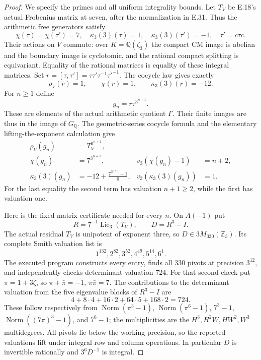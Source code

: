 \documentclass[11pt,oneside]{article}
\begin{document}
\begin{proof}
We specify the primes and all uniform
integrality bounds. Let $T_V$ be E.18's
actual Frobenius matrix at seven, after
the normalization in E.31. Thus the
arithmetic free generators satisfy
\[
 \chi(\tau)=\chi(\tau')=7,
 \quad \kappa_3(3)(\tau)=1,
 \quad \kappa_3(3)(\tau')=-1,
 \quad \tau'=c\tau c.
 \tag{E.38.3}
\]
Their actions on $V$ commute: over
$K=\mathbb Q(\zeta_3)$ the compact CM
image is abelian and the boundary image
is cyclotomic, and the rational compact
splitting is equivariant. Equality of
the rational matrices is equality of
these integral matrices. Set
$r=[\tau,\tau']=\tau\tau'\tau^{-1}\tau'^{-1}$.
The cocycle law gives exactly
\[
           \rho_V(r)=1,\qquad
           \chi(r)=1,\qquad
           \kappa_3(3)(r)=-12.
 \tag{E.38.4}
\]
For $n\ge1$ define
\[
                  g_n=r\tau^{3^{n+1}}.
 \tag{E.38.5}
\]
These are elements of the actual
arithmetic quotient $\Gamma$.
Their finite images are thus in the
image of $G_{\mathbb Q}$.
The geometric-series cocycle formula
and the elementary lifting-the-exponent
calculation give
\[
 \begin{aligned}
 \rho_V(g_n)&=T_V^{3^{n+1}},\\
 \chi(g_n)&=7^{3^{n+1}},
       &v_3(\chi(g_n)-1)&=n+2,\\
 \kappa_3(3)(g_n)&=-12+
       \frac{7^{3^{n+1}}-1}{6},
       &v_3(\kappa_3(3)(g_n))&=1.
 \end{aligned}
 \tag{E.38.6}
\]
For the last equality the second term
has valuation $n+1\ge2$, while the
first has valuation one.

Here is the fixed matrix certificate
needed for every $n$. On $A(-1)$ put
\[
 R=7^{-1}\operatorname{Lie}_3(T_V),
       \qquad D=R^3-I.
\]
The actual residual $T_V$ is unipotent
of exponent three, so $D\in3M_{330}(\mathbb Z_3)$.
Its complete Smith valuation list is
\[
                 1^{132},2^{82},3^{52},
                       4^{49},5^{14},6^1.
 \tag{E.38.7}
\]
The executed program constructs every
entry, finds all $330$ pivots at
precision $3^{12}$, and independently
checks determinant valuation $724$.
For that second check put
$\pi=1+3\zeta$, so
$\pi+\bar\pi=-1$, $\pi\bar\pi=7$.
The contributions to the determinant
valuation from the five eigenvalue
blocks of $R^3-I$ are
\[
                  4+8\cdot4+16\cdot2
                       +64\cdot5+168\cdot2=724.
\]
These follow respectively from
$\operatorname{Norm}(\pi^3-1)$,
$\operatorname{Norm}(\pi^6-1)$,
$7^3-1$, $\operatorname{Norm}((7\pi)^3-1)$,
and $7^6-1$; the multiplicities are
the $H^3,H^2W,HW^2,W^3$ multidegrees.
All pivots lie below the working
precision, so the reported valuations
lift under integral row and column
operations. In particular $D$ is
invertible rationally and $3^6D^{-1}$
is integral.


\end{proof}
\end{document}
